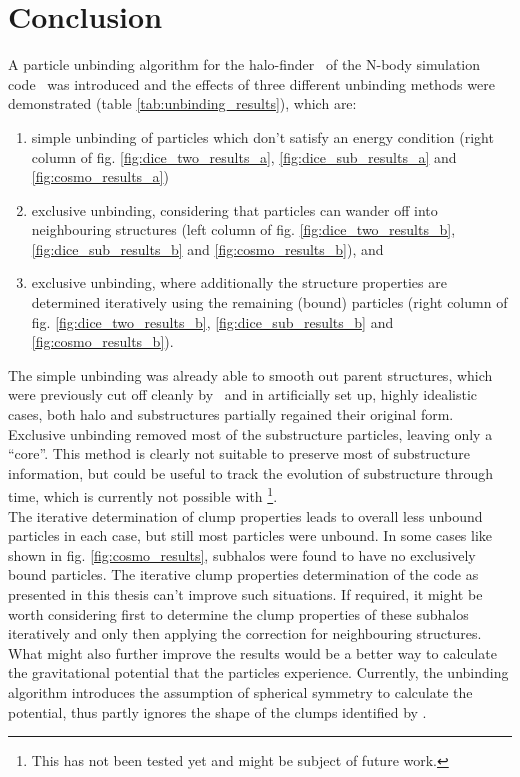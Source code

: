 \section{Conclusion}\label{chap:conclusion}


A particle unbinding algorithm for the halo-finder \phew\ of the N-body simulation code \ramses\ was introduced and the effects of three different unbinding methods were demonstrated (table \ref{tab:unbinding_results}), which are:
\begin{enumerate}
	\item simple unbinding of particles which don't satisfy an energy condition (right column of fig. \ref{fig:dice_two_results_a}, \ref{fig:dice_sub_results_a} and \ref{fig:cosmo_results_a})
	\item exclusive unbinding, considering that particles can wander off into neighbouring structures (left column of fig. \ref{fig:dice_two_results_b}, \ref{fig:dice_sub_results_b} and \ref{fig:cosmo_results_b}), and 
	\item exclusive unbinding, where additionally the structure properties are determined iteratively using the remaining (bound) particles (right column of fig. \ref{fig:dice_two_results_b}, \ref{fig:dice_sub_results_b} and \ref{fig:cosmo_results_b}).
\end{enumerate}

The simple unbinding was already able to smooth out parent structures, which were previously cut off cleanly by \phew\ and in artificially set up, highly idealistic cases, both halo and substructures partially regained their original form.\\
Exclusive unbinding removed most of the substructure particles, leaving only a ``core''.
This method is clearly not suitable to preserve most of substructure information, but could be useful to track the evolution of substructure  through time, which is currently not possible with \phew\footnote{
	This has not been tested yet and might be subject of future work.	
}.\\
The iterative determination of clump properties leads to overall less unbound particles in each case, but still most particles were unbound.
In some cases like shown in fig. \ref{fig:cosmo_results}, subhalos were found to have no exclusively bound particles.
The iterative clump properties determination of the code as presented in this thesis can't improve such situations.
If required, it might be worth considering first to determine the clump properties of these subhalos iteratively and only then applying the correction for neighbouring structures.\\
What might also further improve the results would be a better way to calculate the gravitational potential that the particles experience.
Currently, the unbinding algorithm introduces the assumption of spherical symmetry to calculate the potential, thus partly ignores the shape of the clumps identified by \phew.


